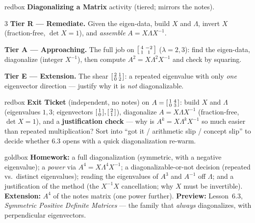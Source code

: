 \documentclass[10pt]{article}
\begin{document}
\begin{skillbox}{redbox}
\textbf{Diagonalizing a Matrix} activity (tiered; mirrors the notes).
\begin{multicols}{3}
\textbf{Tier R --- Remediate.} Given the eigen-data, build $X$ and $\Lambda$, invert $X$
(fraction-free, $\det X=1$), and \emph{assemble} $A=X\Lambda X^{-1}$.

\columnbreak
\textbf{Tier A --- Approaching.} The full job on $\begin{bsmallmatrix}4&-2\\1&1\end{bsmallmatrix}$
($\lambda=2,3$): find the eigen-data, diagonalize (integer $X^{-1}$), then compute $A^2=X\Lambda^2X^{-1}$
and check by squaring.

\columnbreak
\textbf{Tier E --- Extension.} The shear $\begin{bsmallmatrix}2&1\\0&2\end{bsmallmatrix}$: a repeated
eigenvalue with only \emph{one} eigenvector direction --- justify why it is \emph{not} diagonalizable.
\end{multicols}
\end{skillbox}

\begin{skillbox}{redbox}
\textbf{Exit Ticket} (independent, no notes) on $A=\begin{bsmallmatrix}1&4\\0&3\end{bsmallmatrix}$: build
$X$ and $\Lambda$ (eigenvalues $1,3$; eigenvectors $\begin{bsmallmatrix}1\\0\end{bsmallmatrix},\begin{bsmallmatrix}2\\1\end{bsmallmatrix}$),
diagonalize $A=X\Lambda X^{-1}$ (fraction-free, $\det X=1$), and a \textbf{justification check} --- why is
$A^k=X\Lambda^k X^{-1}$ so much easier than repeated multiplication? Sort into ``got it / arithmetic slip /
concept slip'' to decide whether 6.3 opens with a quick diagonalization re-warm.
\end{skillbox}

\begin{skillbox}{goldbox}
\textbf{Homework:} a full diagonalization (symmetric, with a negative eigenvalue); a \emph{power} via
$A^4=X\Lambda^4X^{-1}$; a diagonalizable-or-not decision (repeated vs.\ distinct eigenvalues); reading the
eigenvalues of $A^3$ and $A^{-1}$ off $\Lambda$; and a justification of the method (the $X^{-1}X$
cancellation; why $X$ must be invertible). \textbf{Extension:} $A^4$ of the notes matrix (one power
further). \textbf{Preview:} Lesson~6.3, \emph{Symmetric Positive Definite Matrices} --- the family that
\emph{always} diagonalizes, with perpendicular eigenvectors.
\end{skillbox}
\end{document}
